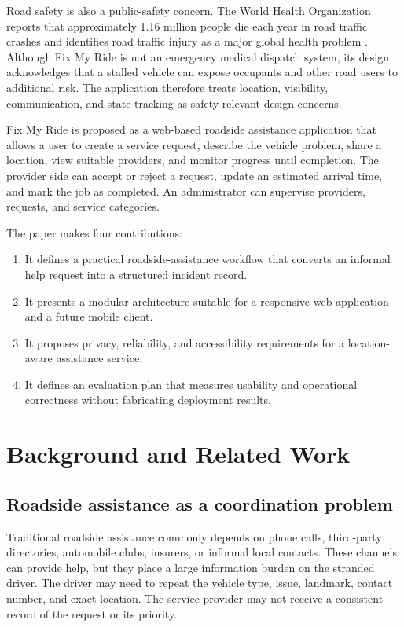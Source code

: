 \documentclass[conference]{IEEEtran}
\begin{document}
Road safety is also a public-safety concern. The World Health Organization reports that approximately 1.16 million people die each year in road traffic crashes and identifies road traffic injury as a major global health problem \cite{who2026}. Although Fix My Ride is not an emergency medical dispatch system, its design acknowledges that a stalled vehicle can expose occupants and other road users to additional risk. The application therefore treats location, visibility, communication, and state tracking as safety-relevant design concerns.

Fix My Ride is proposed as a web-based roadside assistance application that allows a user to create a service request, describe the vehicle problem, share a location, view suitable providers, and monitor progress until completion. The provider side can accept or reject a request, update an estimated arrival time, and mark the job as completed. An administrator can supervise providers, requests, and service categories.

The paper makes four contributions:
\begin{enumerate}
    \item It defines a practical roadside-assistance workflow that converts an informal help request into a structured incident record.
    \item It presents a modular architecture suitable for a responsive web application and a future mobile client.
    \item It proposes privacy, reliability, and accessibility requirements for a location-aware assistance service.
    \item It defines an evaluation plan that measures usability and operational correctness without fabricating deployment results.
\end{enumerate}

\section{Background and Related Work}

\subsection{Roadside assistance as a coordination problem}
Traditional roadside assistance commonly depends on phone calls, third-party directories, automobile clubs, insurers, or informal local contacts. These channels can provide help, but they place a large information burden on the stranded driver. The driver may need to repeat the vehicle type, issue, landmark, contact number, and exact location. The service provider may not receive a consistent record of the request or its priority.
\end{document}

